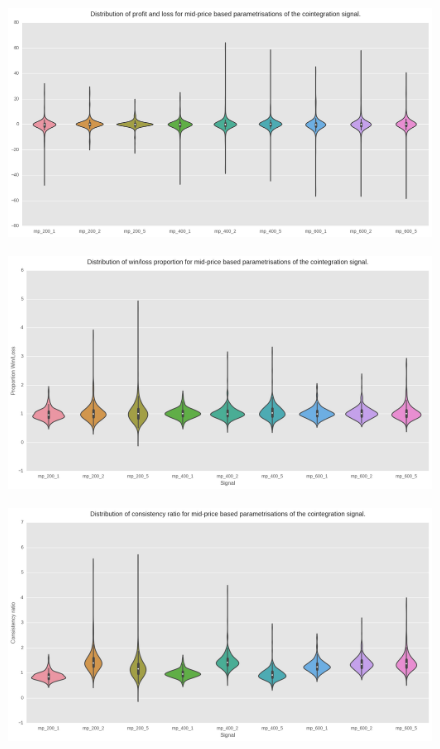 \begin{figure}[H]
    \centering
    \includegraphics[width=\figwidth]{img/mp_nodelay.png}

    \caption{}\label{fig:mp_nodelay:pnl}
\end{figure}

\begin{figure}[H]
    \centering
    \includegraphics[width=\figwidth]{img/mp_nodelay_propwl.png}

    \caption{}\label{fig:mp_nodelay:propwl}
\end{figure}

\begin{figure}[H]
    \centering
    \includegraphics[width=\figwidth]{img/mp_nodelay_cr.png}

    \caption{}\label{fig:mp_nodelay:cr}
\end{figure}

